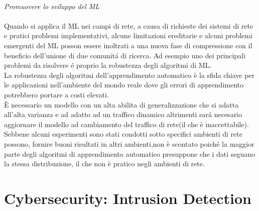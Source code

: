 \documentclass[../tesi.tex]{subfiles}
\begin{document}
\\
\textit{Promuovere lo sviluppo del ML}\\
\\Quando si applica il ML nei campi di rete, a causa di richieste dei sistemi di rete e pratici problemi implementativi, alcune limitazioni ereditarie e alcuni problemi emergenti del ML posson essere inoltrati a una nuova fase di compressione con il beneficio dell’unione di due comunitá di ricerca.
Ad esempio uno dei principali problemi da risolvere é proprio la robustezza degli algoritmi di ML.\\ 
La robustezza degli algoritmi dell’apprendimento automatico è la sfida chiave per le applicazioni nell’ambiente del mondo reale dove gli errori di apprendimento potrebbero portare a costi elevati.\\
È necessario un modello con un alta abilita di generalizzazione che si adatta all’alta varianza e ad adatto ad un traffico dinamico altrimenti sará necesario aggiornare il modello ad cambiamento del traffico di rete(il che è inaccettabile).\\
Sebbene alcuni esperimenti sono stati condotti sotto specifici ambienti di rete possono, fornire buoni risultati in altri ambienti,non è scontato poiché la maggior parte degli algoritmi di apprendimento automatico presuppone che i dati seguano la stessa distribuzione, il che non è pratico negli ambienti di rete.


\section{Cybersecurity: Intrusion Detection}
\end{document}
